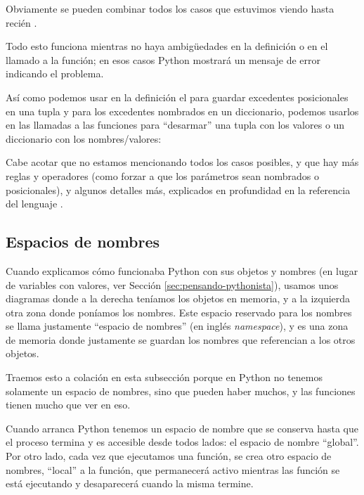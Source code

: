Obviamente se pueden combinar todos los casos que estuvimos viendo hasta recién .


Todo esto funciona mientras no haya ambigüedades en la definición o en el llamado a la función; en esos casos Python mostrará un mensaje de error indicando el problema.


Así como podemos usar en la definición el \mip{*} para guardar excedentes posicionales en una tupla y \mip{**} para los excedentes nombrados en un diccionario, podemos usarlos en las llamadas a las funciones para ``desarmar'' una tupla con los valores o un diccionario con los nombres/valores:


Cabe acotar que no estamos mencionando todos los casos posibles, y que hay más reglas y operadores (como forzar a que los parámetros sean nombrados o posicionales), y algunos detalles más, explicados en profundidad en la referencia del lenguaje \cite{referencia_funciones}.


\subsection{Espacios de nombres}

Cuando explicamos cómo funcionaba Python con sus objetos y nombres (en lugar de variables con valores, ver Sección \ref{sec:pensando-pythonista}), usamos unos diagramas donde a la derecha teníamos los objetos en memoria, y a la izquierda otra zona donde poníamos los nombres. Este espacio reservado para los nombres se llama justamente ``espacio de nombres'' (en inglés \textit{namespace}), y es una zona de memoria donde justamente se guardan los nombres que referencian a los otros objetos.

Traemos esto a colación en esta subsección porque en Python no tenemos solamente un espacio de nombres, sino que pueden haber muchos, y las funciones tienen mucho que ver en eso.

Cuando arranca Python tenemos un espacio de nombre que se conserva hasta que el proceso termina y es accesible desde todos lados: el espacio de nombre ``global''. Por otro lado, cada vez que ejecutamos una función, se crea otro espacio de nombres, ``local'' a la función, que permanecerá activo mientras las función se está ejecutando y desaparecerá cuando la misma termine.

